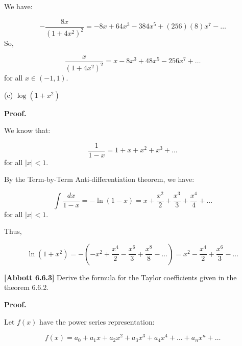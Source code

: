 \documentclass[10pt]{article}
\begin{document}
We have:


\begin{equation*}
-\frac{8x}{\left( 1+4x^{2}\right)^{2}} =-8x+64x^{3} -384x^{5} +( 256)( 8) x^{7} -\dotsc 
\end{equation*}
So,


\begin{equation*}
\frac{x}{\left( 1+4x^{2}\right)^{2}} =x-8x^{3} +48x^{5} -256x^{7} +\dotsc 
\end{equation*}
for all $\displaystyle x\in ( -1,1)$.





(c) $\displaystyle \log\left( 1+x^{2}\right)$



\textbf{Proof.}



We know that:


\begin{equation*}
\frac{1}{1-x} =1+x+x^{2} +x^{3} +\dotsc 
\end{equation*}
for all $\displaystyle |x|< 1$.



By the Term-by-Term Anti-differentiation theorem, we have:


\begin{equation*}
\int \frac{dx}{1-x} =-\ln( 1-x) =x+\frac{x^{2}}{2} +\frac{x^{3}}{3} +\frac{x^{4}}{4} +\dotsc 
\end{equation*}
for all $\displaystyle |x|< 1$.



Thus,


\begin{equation*}
\ln\left( 1+x^{2}\right) =-\left( -x^{2} +\frac{x^{4}}{2} -\frac{x^{6}}{3} +\frac{x^{8}}{8} -\dotsc \right) =x^{2} -\frac{x^{4}}{2} +\frac{x^{6}}{3} -\dotsc 
\end{equation*}


 

\textbf{[Abbott 6.6.3]} Derive the formula for the Taylor coefficients given in the theorem 6.6.2.



\textbf{Proof.}



Let $\displaystyle f( x)$ have the power series representation:


\begin{equation*}
f( x) =a_{0} +a_{1} x+a_{2} x^{2} +a_{3} x^{3} +a_{4} x^{4} +\dotsc +a_{n} x^{n} +\dotsc 
\end{equation*}
\end{document}
